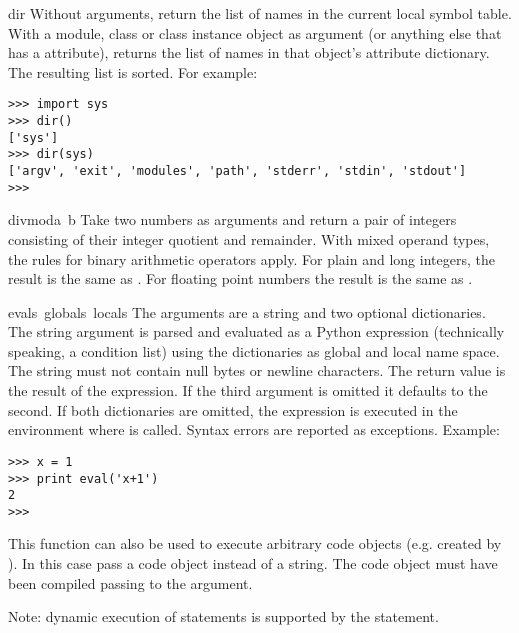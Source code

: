 \begin{funcdesc}{dir}{}
  Without arguments, return the list of names in the current local
  symbol table.  With a module, class or class instance object as
  argument (or anything else that has a  attribute),
  returns the list of names in that object's attribute dictionary.
  The resulting list is sorted.  For example:

\bcode\begin{verbatim}
>>> import sys
>>> dir()
['sys']
>>> dir(sys)
['argv', 'exit', 'modules', 'path', 'stderr', 'stdin', 'stdout']
>>> 
\end{verbatim}\ecode
\end{funcdesc}

\begin{funcdesc}{divmod}{a\, b}
  Take two numbers as arguments and return a pair of integers
  consisting of their integer quotient and remainder.  With mixed
  operand types, the rules for binary arithmetic operators apply.  For
  plain and long integers, the result is the same as
  .
  For floating point numbers the result is the same as
  .
\end{funcdesc}

\begin{funcdesc}{eval}{s\, globals\, locals}
  The arguments are a string and two optional dictionaries.  The
  string argument is parsed and evaluated as a Python expression
  (technically speaking, a condition list) using the dictionaries as
  global and local name space.  The string must not contain null bytes
  or newline characters.  The return value is the
  result of the expression.  If the third argument is omitted it
  defaults to the second.  If both dictionaries are omitted, the
  expression is executed in the environment where  is
  called.  Syntax errors are reported as exceptions.  Example:

\bcode\begin{verbatim}
>>> x = 1
>>> print eval('x+1')
2
>>> 
\end{verbatim}\ecode

  This function can also be used to execute arbitrary code objects
  (e.g. created by ).  In this case pass a code
  object instead of a string.  The code object must have been compiled
  passing  to the  argument.

  Note: dynamic execution of statements is supported by the
   statement.

\end{funcdesc}

